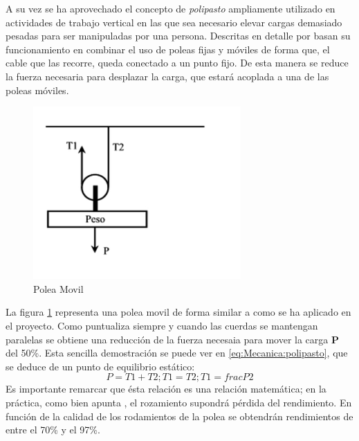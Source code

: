     A su vez se ha aprovechado el concepto de \textit{polipasto} ampliamente utilizado en actividades de trabajo vertical en las que sea necesario elevar cargas demasiado pesadas para ser manipuladas por una persona. Descritas en detalle por \cite{granvertical} basan su funcionamiento en combinar el uso de poleas fijas y móviles de forma que, el cable que las recorre, queda conectado a un punto fijo. De esta manera se reduce la fuerza necesaria para desplazar la carga, que estará acoplada a una de las poleas móviles.

    \begin{minipage}{0.30\textwidth}
        \begin{figure}[H]
            \centering
            \includegraphics[width=\textwidth]{figuras/Imagenes_Mecanica/pmovil.png}
            \caption{Polea Movil}
            \label{fig:Mecanica:pmovil}
        \end{figure}
    \end{minipage}
    \begin{minipage}{0.60\textwidth}\raggedright

        La figura \ref{fig:Mecanica:pmovil} representa una polea movil de forma similar a como se ha aplicado en el proyecto. Como puntualiza \cite{granvertical} siempre y cuando las cuerdas se mantengan paralelas se obtiene una reducción de la fuerza necesaia para mover la carga \textbf{P} del 50\%. Esta sencilla demostración se puede ver en \ref{eq:Mecanica:polipasto}, que se deduce de un punto de equilibrio estático:
        \begin{equation}
            \label{eq:Mecanica:polipasto}
            P = T1 + T2 ; T1 = T2 ; T1 = frac{P}{2}
        \end{equation}
        Es importante remarcar que ésta relación es una relación matemática; en la práctica, como bien apunta \cite{granvertical}, el rozamiento supondrá pérdida del rendimiento. En función de la calidad de los rodamientos de la polea se obtendrán rendimientos de entre el 70\% y el 97\%.
    \end{minipage}

